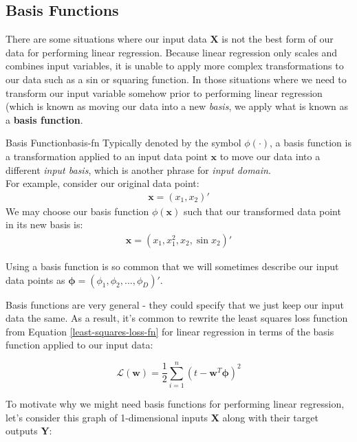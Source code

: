 \subsection{Basis Functions}
There are some situations where our input data $\textbf{X}$ is not the best form of our data for performing linear regression. Because linear regression only scales and combines input variables, it is unable to apply more complex transformations to our data such as a sin or squaring function. In those situations where we need to transform our input variable somehow prior to performing linear regression (which is known as moving our data into a new \textit{basis}, we apply what is known as a \textbf{basis function}.

\begin{definition}{Basis Function}{basis-fn}
    Typically denoted by the symbol $\phi(\cdot)$, a basis function is a transformation applied to an input data point $\textbf{x}$ to move our data into a different \textit{input basis}, which is another phrase for \textit{input domain}. \\

    For example, consider our original data point:
    \begin{align*}
        \textbf{x} = (x_{1}, x_{2})'
    \end{align*}
    We may choose our basis function $\phi(\textbf{x})$ such that our transformed data point in its new basis is:
    \begin{align*}
        \textbf{x} = (x_{1}, x_{1}^2, x_{2}, \sin{x_{2}})'
    \end{align*}

    Using a basis function is so common that we will sometimes describe our input data points as $\boldsymbol{\phi} = (\phi_{1}, \phi_{2}, ..., \phi_{D})'$.
\end{definition}

Basis functions are very general - they could specify that we just keep our input data the same. As a result, it's common to rewrite the least squares loss function from Equation \ref{least-squares-loss-fn} for linear regression in terms of the basis function applied to our input data:

\begin{equation} \label{least-squares-loss-fn-w-basis}
    \mathcal{L}(\textbf{w}) = \frac{1}{2} \sum_{i=1}^{n} (t - \textbf{w}^{T}\boldsymbol{\phi})^2
\end{equation}

To motivate why we might need basis functions for performing linear regression, let's consider this graph of 1-dimensional inputs \textbf{X} along with their target outputs \textbf{Y}:

